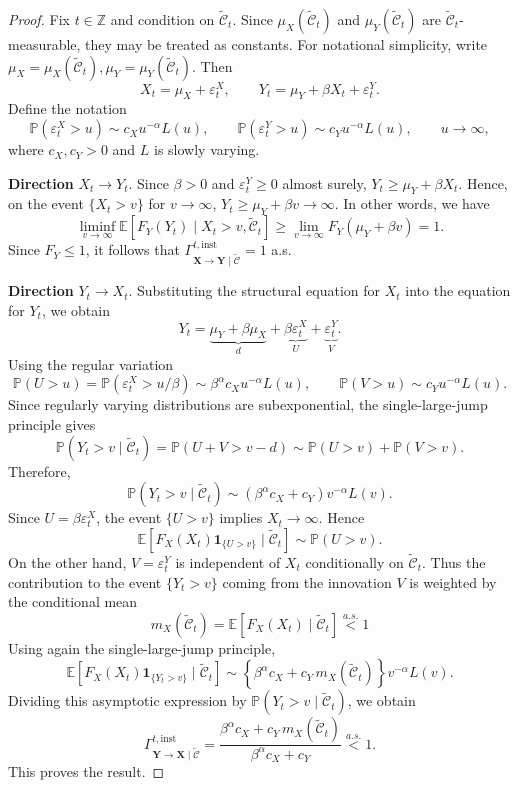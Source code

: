 \documentclass[a4paper,11pt]{article}
\begin{document}
\begin{proof}
Fix \(t\in\mathbb Z\) and condition on \(\tilde{\mathcal C}_t\). Since \(\mu_X(\tilde{\mathcal C}_t)\) and \(\mu_Y(\tilde{\mathcal C}_t)\) are \(\tilde{\mathcal C}_t\)-measurable, they may be treated as constants. For notational simplicity, write $\mu_X=\mu_X(\tilde{\mathcal C}_t), \mu_Y=\mu_Y(\tilde{\mathcal C}_t)$. Then
\[
X_t=\mu_X+\varepsilon_t^X,
\qquad
Y_t=\mu_Y+\beta X_t+\varepsilon_t^Y .
\]
Define the notation \[
\mathbb P(\varepsilon_t^X>u)\sim c_X u^{-\alpha}L(u),
\qquad
\mathbb P(\varepsilon_t^Y>u)\sim c_Y u^{-\alpha}L(u),
\qquad u\to\infty,
\]
where \(c_X,c_Y>0\) and \(L\) is slowly varying. 

\textbf{Direction} \(X_t\to Y_t\). Since \(\beta>0\) and \(\varepsilon_t^Y\ge 0\) almost surely, \( Y_t\ge \mu_Y+\beta X_t
\). Hence, on the event \(\{X_t>v\}\) for $v\to\infty$, \(
Y_t\ge \mu_Y+\beta v\to\infty .
\) In other words, we have
\[
\liminf_{v\to\infty}
\mathbb E\!\left[
F_Y(Y_t)\mid X_t>v,\tilde{\mathcal C}_t
\right]
\ge
\lim_{v\to\infty}F_Y(\mu_Y+\beta v)
=1.
\]
Since \(F_Y\le 1\), it follows that \(
\Gamma^{t,\mathrm{inst}}_{\mathbf X\to\mathbf Y\mid\tilde{\mathcal C}}=1
\) a.s.

\textbf{Direction} \(Y_t\to X_t\).  Substituting the structural equation for \(X_t\)
into the equation for \(Y_t\), we obtain
\[
Y_t
=
\underbrace{\mu_Y+\beta\mu_X}_{d}
+
\underbrace{\beta\varepsilon_t^X}_{U}
+
\underbrace{\varepsilon_t^Y}_{V}.
\]
Using the regular variation
\[
\mathbb P(U>u)
=
\mathbb P(\varepsilon_t^X>u/\beta)
\sim
\beta^\alpha c_X u^{-\alpha}L(u), \qquad \mathbb P(V>u)
\sim
c_Y u^{-\alpha}L(u).
\]
Since regularly varying distributions are subexponential, the single-large-jump principle gives
\[
\mathbb P(Y_t>v\mid\tilde{\mathcal C}_t)
=
\mathbb P(U+V>v-d)
\sim
\mathbb P(U>v)+\mathbb P(V>v).
\]
Therefore,
\[
\mathbb P(Y_t>v\mid\tilde{\mathcal C}_t)
\sim
\left(\beta^\alpha c_X+c_Y\right)v^{-\alpha}L(v).
\]
Since \(U=\beta\varepsilon_t^X\), the event \(\{U>v\}\) implies \(X_t\to\infty\). Hence
\[
\mathbb E\!\left[
F_X(X_t)\mathbf 1_{\{U>v\}}\mid\tilde{\mathcal C}_t
\right]
\sim
\mathbb P(U>v).
\]
On the other hand, \(V=\varepsilon_t^Y\) is independent of \(X_t\) conditionally on
\(\tilde{\mathcal C}_t\). Thus the contribution to the event \(\{Y_t>v\}\) coming from
the innovation \(V\) is weighted by the conditional mean
\[
m_X(\tilde{\mathcal C}_t)
=
\mathbb E\!\left[
F_X(X_t)\mid\tilde{\mathcal C}_t
\right]\overset{a.s.}{<}1
\]
Using again the single-large-jump principle,
\[
\mathbb E\!\left[
F_X(X_t)\mathbf 1_{\{Y_t>v\}}\mid\tilde{\mathcal C}_t
\right]
\sim
\left\{
\beta^\alpha c_X+c_Y\,m_X(\tilde{\mathcal C}_t)
\right\}
v^{-\alpha}L(v).
\]
Dividing this asymptotic expression by \(\mathbb P(Y_t>v\mid\tilde{\mathcal C}_t)\), we obtain
\[
\Gamma^{t,\mathrm{inst}}_{\mathbf Y\to\mathbf X\mid\tilde{\mathcal C}}
=
\frac{
\beta^\alpha c_X+c_Y\,m_X(\tilde{\mathcal C}_t)
}{
\beta^\alpha c_X+c_Y
}\overset{a.s.}{<} 1. 
\]
This proves the result.
\end{proof}
\end{document}
